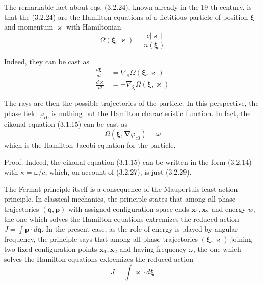 \documentclass{article}
\begin{document}
The remarkable fact about eqs. (3.2.24), known already in the 19-th century, is that the (3.2.24) are the Hamilton equations of a fictitious particle of position $\boldsymbol{\xi}$ and momentum $\boldsymbol{\varkappa}$ with Hamiltonian
$$
\begin{equation*}
\Omega(\boldsymbol{\xi}, \boldsymbol{\varkappa})=\frac{c|\boldsymbol{\varkappa}|}{n(\boldsymbol{\xi})} \tag{3.2.27}
\end{equation*}
$$

Indeed, they can be cast as
$$
\begin{align*}
\frac{d \boldsymbol{\xi}}{d t} & =\nabla_{\varkappa} \Omega(\boldsymbol{\xi}, \boldsymbol{\varkappa})  \tag{3.2.28a}\\
\frac{d \varkappa}{d t} & =-\nabla_{\boldsymbol{\xi}} \Omega(\boldsymbol{\xi}, \boldsymbol{\varkappa}) \tag{3.2.28b}
\end{align*}
$$

The rays are then the possible trajectories of the particle. In this perspective, the phase field $\varphi_{c 0}$ is nothing but the Hamilton characteristic function. In fact, the eikonal equation (3.1.15) can be cast as
$$
\begin{equation*}
\Omega\left(\boldsymbol{\xi}, \boldsymbol{\nabla} \varphi_{c 0}\right)=\omega \tag{3.2.29}
\end{equation*}
$$
which is the Hamilton-Jacobi equation for the particle.

Proof. Indeed, the eikonal equation (3.1.15) can be written in the form (3.2.14) with $\kappa=\omega / c$, which, on account of (3.2.27), is just (3.2.29).

The Fermat principle itself is a consequence of the Maupertuis least action
principle. In classical mechanics, the principle states that among all phase trajectories $(\boldsymbol{q}, \boldsymbol{p})$ with assigned configuration space ends $\boldsymbol{x}_{1}, \boldsymbol{x}_{2}$ and energy $w$, the one which solves the Hamilton equations extremizes the reduced action $J=\int \boldsymbol{p} \cdot d \boldsymbol{q}$. In the present case, as the role of energy is played by angular frequency, the principle says that among all phase trajectories $(\boldsymbol{\xi}, \boldsymbol{\varkappa})$ joining two fixed configuration points $\boldsymbol{x}_{1}, \boldsymbol{x}_{2}$ and having frequency $\omega$, the one which solves the Hamilton equations extremizes the reduced action
$$
\begin{equation*}
J=\int \varkappa \cdot d \boldsymbol{\xi} \tag{3.2.30}
\end{equation*}
$$
\end{document}

